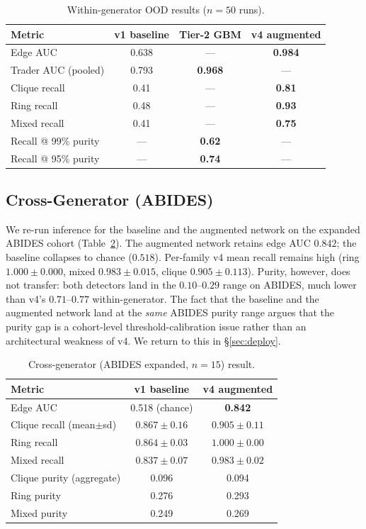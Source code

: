 \documentclass[10pt,twocolumn,letterpaper]{article}
\begin{document}
\begin{table}[t]
\caption{Within-generator OOD results ($n{=}50$ runs).}
\label{tab:ood}
\centering
\footnotesize
\begin{tabular}{lccc}
\toprule
Metric & v1 baseline & Tier-2 GBM & v4 augmented \\
\midrule
Edge AUC & 0.638 & --- & \textbf{0.984} \\
Trader AUC (pooled) & 0.793 & \textbf{0.968} & --- \\
Clique recall & 0.41 & --- & \textbf{0.81} \\
Ring recall & 0.48 & --- & \textbf{0.93} \\
Mixed recall & 0.41 & --- & \textbf{0.75} \\
Recall @ 99\% purity & --- & \textbf{0.62} & --- \\
Recall @ 95\% purity & --- & \textbf{0.74} & --- \\
\bottomrule
\end{tabular}
\end{table}

\subsection{Cross-Generator (ABIDES)}
We re-run inference for the baseline and the augmented network on the
expanded ABIDES cohort (Table~\ref{tab:abides}). The augmented network
retains edge AUC \(0.842\); the baseline collapses to chance
(\(0.518\)). Per-family v4 mean recall remains high (ring
\(1.000\pm0.000\), mixed \(0.983\pm0.015\), clique \(0.905\pm0.113\)).
Purity, however, does not transfer: both detectors land in the
\(0.10\)--\(0.29\) range on ABIDES, much lower than v4's
\(0.71\)--\(0.77\) within-generator. The fact that the baseline and the
augmented network land at the \emph{same} ABIDES purity range argues
that the purity gap is a cohort-level threshold-calibration issue
rather than an architectural weakness of v4. We return to this in
\S\ref{sec:deploy}.

\begin{table}[t]
\caption{Cross-generator (ABIDES expanded, $n{=}15$) result.}
\label{tab:abides}
\centering
\footnotesize
\begin{tabular}{lcc}
\toprule
Metric & v1 baseline & v4 augmented \\
\midrule
Edge AUC & 0.518 (chance) & \textbf{0.842} \\
Clique recall (mean$\pm$sd) & $0.867\pm0.16$ & $\mathbf{0.905\pm0.11}$ \\
Ring recall & $0.864\pm0.03$ & $\mathbf{1.000\pm0.00}$ \\
Mixed recall & $0.837\pm0.07$ & $\mathbf{0.983\pm0.02}$ \\
Clique purity (aggregate) & 0.096 & 0.094 \\
Ring purity & 0.276 & 0.293 \\
Mixed purity & 0.249 & 0.269 \\
\bottomrule
\end{tabular}
\end{table}
\end{document}

